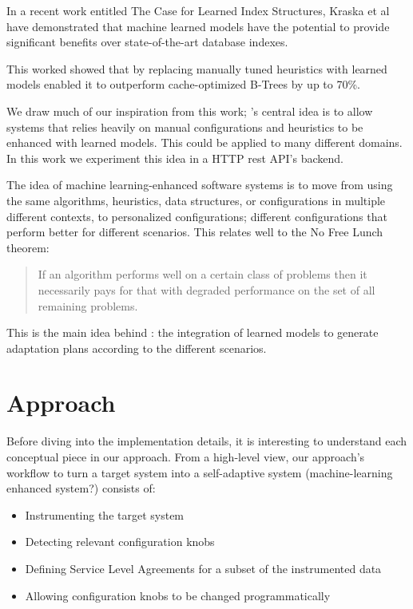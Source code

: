 In a recent work entitled The Case for Learned Index Structures, Kraska et al have demonstrated that machine learned models have the potential to provide significant benefits over state-of-the-art database indexes. \cite{kraska_case_2017}

This worked showed that by replacing manually tuned heuristics with learned models enabled it to outperform cache-optimized B-Trees by up to 70\%.

We draw much of our inspiration from this work; \projectname{}'s central idea is to allow systems that relies heavily on manual configurations and heuristics to be enhanced with learned models. This could be applied to many different domains. In this work we experiment this idea in a HTTP rest API's backend.  

The idea of machine learning-enhanced software systems is to move from using the same algorithms, heuristics, data structures, or configurations in multiple different contexts, to personalized configurations; different configurations that perform better for different scenarios. This relates well to the No Free Lunch theorem:
\begin{quote}
  If an algorithm performs well on a certain class of problems then it necessarily pays for that with degraded performance on the set of all remaining problems.
\end{quote}

This is the main idea behind \projectname{}: the integration of learned models to generate adaptation plans according to the different scenarios.

\section{Approach}


Before diving into the implementation details, it is interesting to understand each conceptual piece in our approach. From a high-level view, our approach's workflow to turn a target system into a self-adaptive system (machine-learning enhanced system?) consists of:

\begin{itemize}
  \item Instrumenting the target system
  \item Detecting relevant configuration knobs
  \item Defining Service Level Agreements for a subset of the instrumented data
  \item Allowing configuration knobs to be changed programmatically
\end{itemize}

